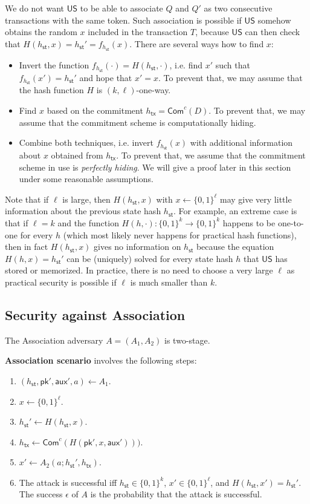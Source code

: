 \documentclass{article}
\newcommand{\pubkey}[0]{\mathsf{pk}}
\newcommand{\commitc}[0]{{\mathsf{Com}^{c}}}
\newcommand{\unisrv}[0]{\mathsf{US}}
\newcommand{\sthash}[0]{{h_\mathsf{st}}}
\newcommand{\txhash}[0]{{h_\mathsf{tx}}}
\newcommand{\auxd}[0]{\mathsf{aux}}
\begin{document}
We do not want $\unisrv$ to be able to associate $Q$ and $Q'$ as two consecutive transactions with the same token. Such association is possible if $\unisrv$ somehow obtains the random $x$ included in the transaction $T$, because $\unisrv$ can then check that $H(\sthash,x)=\sthash'=f_{\sthash}(x)$. There are several ways how to find $x$:
\begin{itemize}
\item Invert the function $f_{\sthash}(\cdot)=H(\sthash,\cdot)$, i.e. find $x'$ such that $f_{\sthash}(x')=\sthash'$ and hope that $x'=x$. To prevent that, we may assume that the hash function $H$ is $(k,\ell)$-one-way.
\item Find $x$ based on the commitment $\txhash=\commitc(D)$. To prevent that, we may assume that the commitment scheme is computationally hiding.
\item Combine both techniques, i.e. invert $f_{\sthash}(x)$ with additional information about $x$ obtained from $\txhash$. To prevent that, we assume that the commitment scheme in use is \emph{perfectly hiding}. We will give a proof later in this section under some reasonable assumptions.
\end{itemize}

\noindent Note that if $\ell$ is large, then $H(\sthash,x)$ with $x\gets \{0,1\}^\ell$ may give very little information about the previous state hash $\sthash$.
For example, an extreme case is that if $\ell=k$ and the function $H(h,\cdot)\colon \{0,1\}^k\rightarrow \{0,1\}^k$ happens to be one-to-one for every $h$ (which most likely never happens for practical hash functions), then in fact $H(\sthash,x)$ gives no information on $\sthash$  because the equation $H(h,x)=\sthash'$ can be (uniquely) solved for every state hash $h$ that $\unisrv$ has stored or memorized. In practice, there is no need to choose a very large $\ell$ as practical security is possible if $\ell$ is much smaller than $k$.

\subsection{Security against Association}\label{sec:association}

The Association adversary $A=(A_1,A_2)$ is two-stage. \medskip

\noindent\textbf{Association scenario} involves the following steps:
\begin{enumerate}
\item $(\sthash, \pubkey', \auxd', a)\gets A_1$.
\item $x\gets \{0,1\}^\ell$.
\item $\sthash'\gets H(\sthash,x)$.
\item $\txhash\gets\commitc(H(\pubkey',x,\auxd')))$.
\item $x'\gets A_2(a; \sthash',\txhash)$.
\item The attack is successful iff $\sthash\in\{0,1\}^k$, $x'\in\{0,1\}^\ell$, and $H(\sthash,x')=\sthash'$. The success $\epsilon$ of $A$ is the probability that the attack is successful.
\end{enumerate}
\end{document}
